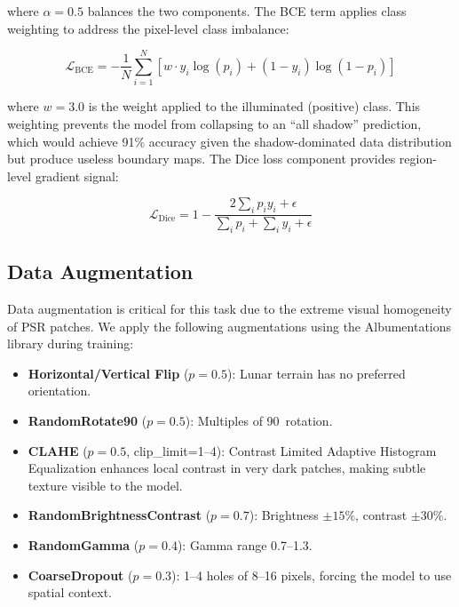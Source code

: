 \documentclass[journal]{IEEEtran}
\begin{document}
where $\alpha = 0.5$ balances the two components. The BCE term applies class weighting to address the pixel-level class imbalance:

\begin{equation}
\mathcal{L}_{\text{BCE}} = -\frac{1}{N} \sum_{i=1}^{N} \left[ w \cdot y_i \log(p_i) + (1 - y_i) \log(1 - p_i) \right]
\label{eq:bce}
\end{equation}

where $w = 3.0$ is the weight applied to the illuminated (positive) class. This weighting prevents the model from collapsing to an ``all shadow'' prediction, which would achieve 91\% accuracy given the shadow-dominated data distribution but produce useless boundary maps. The Dice loss component provides region-level gradient signal:

\begin{equation}
\mathcal{L}_{\text{Dice}} = 1 - \frac{2\sum_i p_i y_i + \epsilon}{\sum_i p_i + \sum_i y_i + \epsilon}
\label{eq:dice}
\end{equation}

\subsection{Data Augmentation}

Data augmentation is critical for this task due to the extreme visual homogeneity of PSR patches. We apply the following augmentations using the Albumentations library during training:

\begin{itemize}
    \item \textbf{Horizontal/Vertical Flip} ($p=0.5$): Lunar terrain has no preferred orientation.
    \item \textbf{RandomRotate90} ($p=0.5$): Multiples of 90\textdegree~rotation.
    \item \textbf{CLAHE} ($p=0.5$, clip\_limit=1--4): Contrast Limited Adaptive Histogram Equalization enhances local contrast in very dark patches, making subtle texture visible to the model.
    \item \textbf{RandomBrightnessContrast} ($p=0.7$): Brightness $\pm15\%$, contrast $\pm30\%$.
    \item \textbf{RandomGamma} ($p=0.4$): Gamma range 0.7--1.3.
    \item \textbf{CoarseDropout} ($p=0.3$): 1--4 holes of 8--16 pixels, forcing the model to use spatial context.
\end{itemize}
\end{document}
